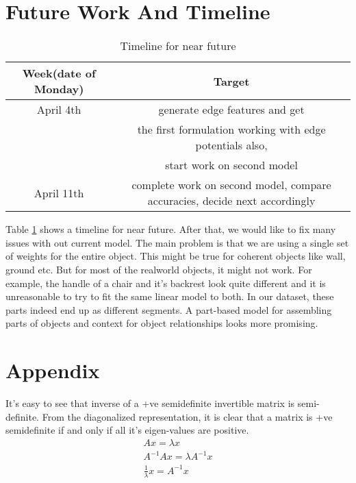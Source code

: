 \documentclass[11pt]{article} %
\begin{document}
 \section{Future Work And Timeline}
 \begin{table}[!h]
\label{tab:Timeline}
\begin{center}
\begin{tabular}{|c|c|} \hline
Week(date of Monday) & Target  \\ 
\hline
April 4th & generate edge features and get\\
& the first formulation working with edge potentials also,\\ 
& start work on second model\\ 
\hline
April 11th & complete work on second model, compare accuracies, decide next accordingly\\ 
\hline

\end{tabular}
\caption{Timeline for near future}
\end{center} 
\end{table}
Table \ref{tab:Timeline} shows a timeline for near future. After that, we would like to fix many issues with out current model. The 
main problem is that we are using a single set of weights for the entire object.
This might be true for coherent objects like wall, ground etc. But for most of the realworld objects, it might not work. For example, the handle of a chair and it's backrest look quite different and it is unreasonable to try to fit the same linear model to both. In our dataset, these parts indeed end up as different segments.
 A part-based model for assembling parts of objects and context for object relationships looks more promising.

\section*{Appendix}
It's easy to see that inverse of a +ve semidefinite invertible matrix is semi-definite.
From the diagonalized representation, it is clear that a matrix is +ve semidefinite if and only if all it's eigen-values are positive.
\begin{eqnarray*}
Ax=\lambda x\\
A^{-1}Ax=\lambda A^{-1}x\\
\frac{1}{\lambda}x=A^{-1}x
\end{eqnarray*}

 

\end{document}
